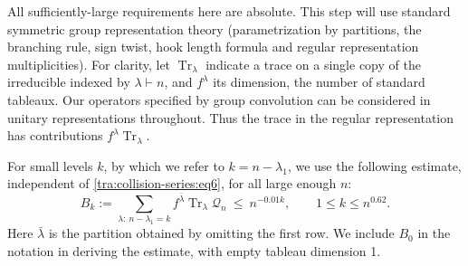 All sufficiently-large requirements here are absolute. This step will use standard symmetric group representation theory (parametrization by partitions, the branching rule, sign twist, hook length formula and regular representation multiplicities). For clarity, let \(\operatorname{Tr}_\lambda\) indicate a trace on a single copy of the irreducible indexed by \(\lambda\vdash n\), and \(f^\lambda\) its dimension, the number of standard tableaux. Our operators specified by group convolution can be considered in unitary representations throughout. Thus the trace in the regular representation has contributions \(f^\lambda \operatorname{Tr}_\lambda\).
\begin{lemma}\label{tra:collision-series:sparse-trace}
\label{tra:collision-series:sparse-trace-statement}
For small levels \(k\), by which we refer to \(k=n-\lambda_1\), we use the following estimate, independent of \eqref{tra:collision-series:eq6}, for all large enough \(n\):
\begin{equation}
B_k:=\sum_{\lambda:\ n-\lambda_1=k} f^{\bar\lambda}\operatorname{Tr}_\lambda \mathcal Q_n
\ \le\ n^{-0.01 k},
\qquad 1\le k\le n^{0.62}. \label{tra:collision-series:eq9}
\end{equation}
Here \(\bar\lambda\) is the partition obtained by omitting the first row. We include \(B_0\) in the notation in deriving the estimate, with empty tableau dimension 1.
\end{lemma}
